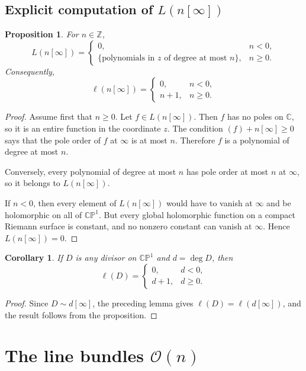 \documentclass[11pt]{article}
\newcommand{\C}{\mathbb{C}}
\newcommand{\Z}{\mathbb{Z}}
\newcommand{\CP}{\mathbb{CP}}
\newcommand{\OO}{\mathcal{O}}
\newcommand{\degd}{\operatorname{deg}}
\newcommand{\CPone}{\CP^1}
\newcommand{\ellD}{\ell}
\theoremstyle{plain}
\newtheorem{proposition}[theorem]{Proposition}
\newtheorem{corollary}[theorem]{Corollary}
\theoremstyle{definition}
\begin{document}
\subsection{Explicit computation of \texorpdfstring{$L(n[\infty])$}{L(n[∞])}}
\begin{proposition}
For $n\in\Z$,
\[
L(n[\infty])=
\begin{cases}
0, & n<0,\\[4pt]
\{\text{polynomials in $z$ of degree at most $n$}\}, & n\ge 0.
\end{cases}
\]
Consequently,
\[
\ellD(n[\infty])=
\begin{cases}
0, & n<0,\\
n+1, & n\ge 0.
\end{cases}
\]
\end{proposition}

\begin{proof}
Assume first that $n\ge 0$. Let $f\in L(n[\infty])$. Then $f$ has no poles on $\C$, so it is an entire function in the coordinate $z$. The condition $(f)+n[\infty]\ge 0$ says that the pole order of $f$ at $\infty$ is at most $n$. Therefore $f$ is a polynomial of degree at most $n$.

Conversely, every polynomial of degree at most $n$ has pole order at most $n$ at $\infty$, so it belongs to $L(n[\infty])$.

If $n<0$, then every element of $L(n[\infty])$ would have to vanish at $\infty$ and be holomorphic on all of $\CPone$. But every global holomorphic function on a compact Riemann surface is constant, and no nonzero constant can vanish at $\infty$. Hence $L(n[\infty])=0$.
\end{proof}

\begin{corollary}
If $D$ is any divisor on $\CPone$ and $d=\degd D$, then
\[
\ellD(D)=
\begin{cases}
0, & d<0,\\
d+1, & d\ge 0.
\end{cases}
\]
\end{corollary}

\begin{proof}
Since $D\sim d[\infty]$, the preceding lemma gives $\ellD(D)=\ellD(d[\infty])$, and the result follows from the proposition.
\end{proof}

\section{The line bundles \texorpdfstring{$\OO(n)$}{O(n)}}
\end{document}
